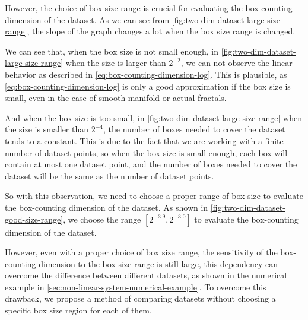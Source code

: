 However, the choice of box size range is crucial for evaluating the box-counting dimension of the dataset.
As we can see from \cref{fig:two-dim-dataset-large-size-range}, the slope of the graph changes a lot when the box size range is changed.


We can see that, when the box size is not small enough, in \cref{fig:two-dim-dataset-large-size-range} when the size is larger than $2^{-2}$, we can not observe the linear behavior as described in \cref{eq:box-counting-dimension-log}.
This is plausible, as \cref{eq:box-counting-dimension-log} is only a good approximation if the box size is small, even in the case of smooth manifold or actual fractals.

And when the box size is too small, in \cref{fig:two-dim-dataset-large-size-range} when the size is smaller than $2^{-4}$, the number of boxes needed to cover the dataset tends to a constant.
This is due to the fact that we are working with a finite number of dataset points, so when the box size is small enough, each box will contain at most one dataset point, and the number of boxes needed to cover the dataset will be the same as the number of dataset points.

So with this observation, we need to choose a proper range of box size to evaluate the box-counting dimension of the dataset.
As shown in \cref{fig:two-dim-dataset-good-size-range}, we choose the range $[2^{-3.9}, 2^{-3.0}]$ to evaluate the box-counting dimension of the dataset.


However, even with a proper choice of box size range, the sensitivity of the box-counting dimension to the box size range is still large, this dependency can overcome the difference between different datasets, as shown in the numerical example in \cref{sec:non-linear-system-numerical-example}.
To overcome this drawback, we propose a method of comparing datasets without choosing a specific box size region for each of them.

